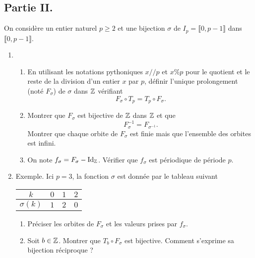 \subsection*{Partie II.}
On considère un entier naturel $p\geq 2$ et une bijection $\sigma$ de $I_p = \llbracket 0, p-1 \rrbracket$ dans $\llbracket 0, p-1 \rrbracket$.
\begin{enumerate}
 \item 
 \begin{enumerate}
  \item En utilisant les notations pythoniques $x // p$ et $x\%p$ pour le quotient et le reste de la division d'un entier $x$ par $p$, définir l'unique prolongement (noté $F_\sigma$) de $\sigma$ dans $\mathbb{Z}$ vérifiant
\begin{displaymath}
  F_\sigma \circ T_p = T_p \circ F_\sigma.
\end{displaymath}

 \item Montrer que $F_\sigma$ est bijective de $\mathbb{Z}$ dans $\mathbb{Z}$ et que 
\begin{displaymath}
 F_{\sigma}^{-1} = F_{\sigma^{-1}}.
\end{displaymath}
 Montrer que chaque orbite de $F_\sigma$ est finie mais que l'ensemble des orbites est infini.
 \item On note $f_\sigma = F_\sigma - \operatorname{Id}_{\mathbb{Z}}$. Vérifier que $f_\sigma$ est périodique de période $p$. 
 \end{enumerate}

\item Exemple. Ici $p=3$, la fonction $\sigma$ est donnée par le tableau suivant

\begin{center} \renewcommand{\arraystretch}{1.2}
\begin{tabular}{|c|c|c|c|} \hline
$k$      & $0$ & $1$ & $2$ \\  \hline
$\sigma(k)$ & $1$ & $2$ & $0$ \\  \hline
\end{tabular}
\end{center}
\begin{enumerate}
 \item Préciser les orbites de $F_\sigma$ et les valeurs prises par $f_\sigma$.
 \item Soit $b\in \mathbb{Z}$. Montrer que $T_b\circ F_\sigma$ est bijective. Comment s'exprime sa bijection réciproque ? 
\end{enumerate}


\end{enumerate}
